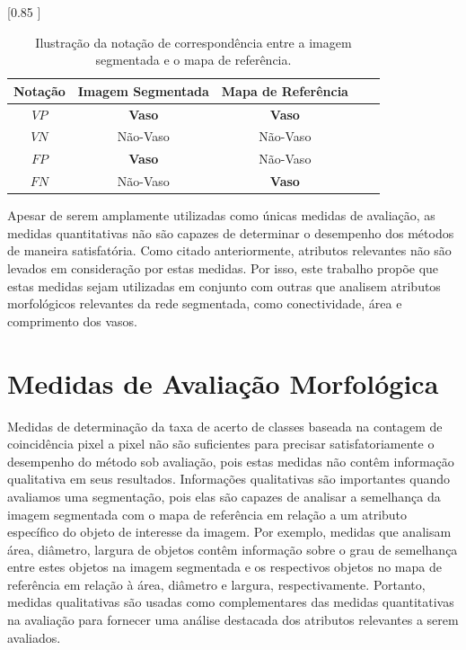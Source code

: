   \begin{table}[h]
    \caption{Ilustra\c{c}\~{a}o da nota\c{c}\~{a}o de correspond\^{e}ncia entre a imagem segmentada e o mapa de refer\^{e}ncia.}
    \label{tabNotacao}
    \centering
    [0.85 ]{ 
      \begin{tabular}{c|cccc}
        \toprule
        Nota\c{c}\~{a}o & Imagem Segmentada & Mapa de Refer\^{e}ncia \\
        \midrule                 
        $VP$  &\textbf{Vaso} &\textbf{Vaso} \\
        $VN$  &N\~{a}o-Vaso &N\~{a}o-Vaso \\
        $FP$  &\textbf{Vaso} &N\~{a}o-Vaso \\
        $FN$  &N\~{a}o-Vaso &\textbf{Vaso} \\
        \bottomrule
      \end{tabular}
    }
  \end{table}

Apesar de serem amplamente utilizadas como \'{u}nicas medidas de avalia\c{c}\~{a}o, as medidas quantitativas n\~{a}o s\~{a}o capazes de determinar o desempenho dos m\'{e}todos de maneira satisfat\'{o}ria. Como citado anteriormente, atributos relevantes n\~{a}o s\~{a}o levados em considera\c{c}\~{a}o por estas medidas. Por isso, este trabalho prop\~{o}e que estas medidas sejam utilizadas em conjunto com outras que analisem atributos morfol\'{o}gicos relevantes da rede segmentada, como conectividade, \'{a}rea e comprimento dos vasos. 

\section{Medidas de Avalia\c{c}\~{a}o Morfol\'{o}gica}

Medidas de determina\c{c}\~{a}o da taxa de acerto de classes baseada na contagem de coincid\^{e}ncia pixel a pixel n\~{a}o s\~{a}o suficientes para precisar satisfatoriamente o desempenho do m\'{e}todo sob avalia\c{c}\~{a}o, pois estas medidas n\~{a}o cont\^{e}m informa\c{c}\~{a}o qualitativa em seus resultados. Informa\c{c}\~{o}es qualitativas s\~{a}o importantes quando avaliamos uma segmenta\c{c}\~{a}o, pois elas s\~{a}o capazes de analisar a semelhan\c{c}a da imagem segmentada com o mapa de refer\^{e}ncia em rela\c{c}\~{a}o a um atributo espec\'{i}fico do objeto de interesse da imagem. Por exemplo, medidas que analisam \'{a}rea, di\^{a}metro, largura de objetos cont\^{e}m informa\c{c}\~{a}o sobre o grau de semelhan\c{c}a entre estes objetos na imagem segmentada e os respectivos objetos no mapa de refer\^{e}ncia em rela\c{c}\~{a}o \`{a} \'{a}rea, di\^{a}metro e largura, respectivamente. Portanto, medidas qualitativas s\~{a}o usadas como complementares das medidas quantitativas na  avalia\c{c}\~{a}o para fornecer uma an\'{a}lise destacada dos atributos relevantes a serem avaliados.

